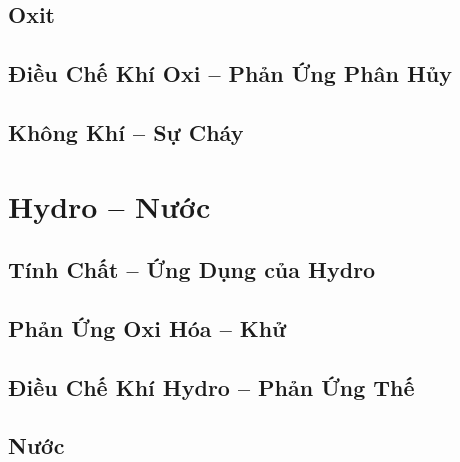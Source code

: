 \documentclass{article}
\numberwithin{equation}{section}
\begin{document}
\subsection{Oxit}


\subsection{Điều Chế Khí Oxi -- Phản Ứng Phân Hủy}


\subsection{Không Khí -- Sự Cháy}


\section{Hydro -- Nước}

\subsection{Tính Chất -- Ứng Dụng của Hydro}


\subsection{Phản Ứng Oxi Hóa -- Khử}


\subsection{Điều Chế Khí Hydro -- Phản Ứng Thế}


\subsection{Nước}
\end{document}
